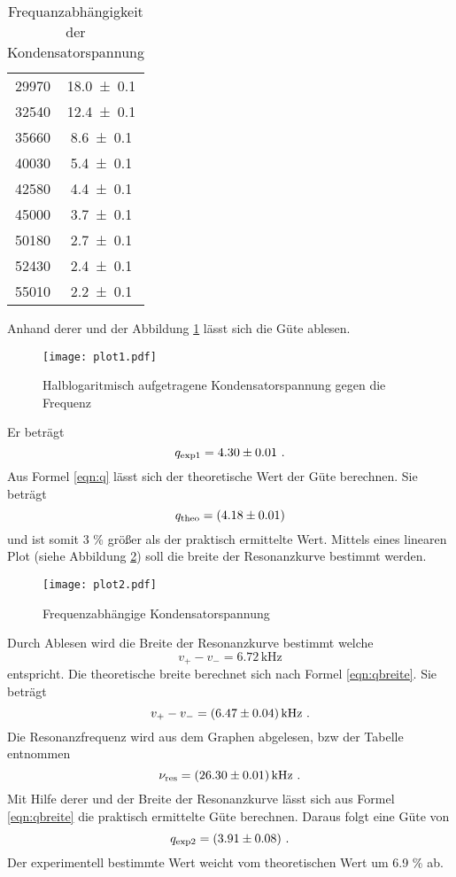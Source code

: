 \begin{table}
\begin{tabular}{c c}
	29970	& \num{18.0 +- 0.1}	\\
	32540	& \num{12.4 +- 0.1}	\\
	35660	& \num{8.6 +- 0.1}	\\
	40030 	& \num{5.4 +- 0.1}	\\
	42580 	& \num{4.4 +- 0.1}	\\
	45000	& \num{3.7 +- 0.1}	\\
	50180	& \num{2.7 +- 0.1}	\\
	52430 	& \num{2.4 +- 0.1}	\\
	55010	& \num{2.2 +- 0.1}	\\
	\bottomrule
 	\end{tabular}
  \caption{Frequanzabhängigkeit der Kondensatorspannung}
  \label{tab:U_c}
\end{table}
Anhand derer und der Abbildung \ref{fig:logUc} lässt sich die Güte ablesen.
\begin{figure}
  \centering
  \texttt{[image: plot1.pdf]}
  \caption{Halblogaritmisch aufgetragene Kondensatorspannung gegen die Frequenz}
  \label{fig:logUc}
\end{figure}
Er beträgt
\begin{equation}
  q_\text{exp1} = \num{4.30 +- 0.01} \ .
  \label{eqn:qexp}
\end{equation}
Aus Formel \ref{eqn:q} lässt sich der theoretische Wert der Güte berechnen. Sie beträgt
\begin{equation}
  q_\text{theo} = (\num{4.18 +- 0.01})
  \label{eqn:qtheo}
\end{equation}
und ist somit 3 \% größer als der praktisch ermittelte Wert. Mittels eines linearen Plot (siehe Abbildung \ref{fig:fUc}) soll die breite der Resonanzkurve bestimmt werden.
\begin{figure}
  \centering
  \texttt{[image: plot2.pdf]}
  \caption{Frequenzabhängige Kondensatorspannung}
  \label{fig:fUc}
\end{figure}
Durch Ablesen wird die Breite der Resonanzkurve bestimmt welche
\begin{equation}
  v_+ - v_- = 6.72 \, \text{kHz}
\end{equation}
entspricht. Die theoretische breite berechnet sich nach Formel \ref{eqn:qbreite}. Sie beträgt
\begin{equation}
	v_+ - v_- = (\num{6.47 +- 0.04}) \, \text{kHz} \ .
	\label{eqn:nures}
\end{equation}
Die Resonanzfrequenz wird aus dem Graphen abgelesen, bzw der Tabelle entnommen
\begin{equation}
  \nu_\text{res} = (\num{26.30 +- 0.01}) \, \text{kHz} \ .
\end{equation}
Mit Hilfe derer und der Breite der Resonanzkurve lässt sich aus Formel \ref{eqn:qbreite} die praktisch ermittelte Güte berechnen. Daraus folgt eine Güte von 
\begin{equation}
  q_\text{exp2} = (\num{3.91 +- 0.08}) \ .
  \label{eqn:qexp2}
\end{equation}
Der experimentell bestimmte Wert weicht vom theoretischen Wert um 6.9 \% ab.
